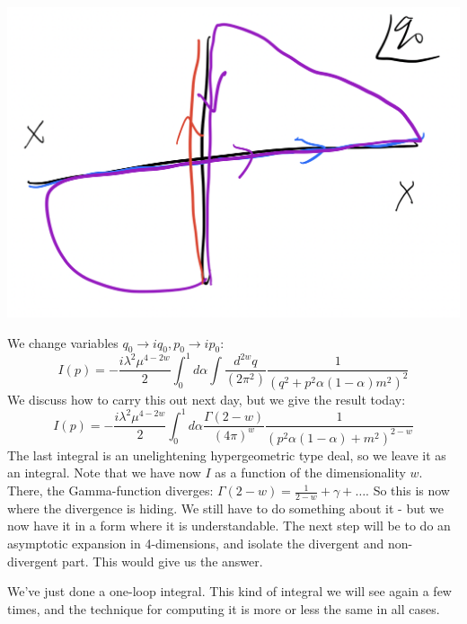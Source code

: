 \begin{center}
\includegraphics[scale=0.3]{Images/fig-lec28integral.png}
\end{center}

We change variables $q_0 \to iq_0, p_0 \to ip_0$:
\begin{equation}
    I(p) = -\frac{i\lambda^2 \mu^{4-2w}}{2}\int_0^1d\alpha \int \frac{d^{2w}q}{(2\pi^2)}\frac{1}{(q^2 + p^2\alpha(1 - \alpha)m^2)^2}
\end{equation}
We discuss how to carry this out next day, but we give the result today:
\begin{equation}
    I(p) = -\frac{i\lambda^2\mu^{4 - 2w}}{2}\int_0^1 d\alpha \frac{\Gamma(2 - w)}{(4\pi)^w} \frac{1}{(p^2\alpha(1-\alpha) + m^2)^{2-w}}
\end{equation} 
The last integral is an unelightening hypergeometric type deal, so we leave it as an integral. Note that we have now $I$ as a function of the dimensionality $w$. There, the Gamma-function diverges: $\Gamma(2 - w) = \frac{1}{2-w} + \gamma + \ldots$. So this is now where the divergence is hiding. We still have to do something about it - but we now have it in a form where it is understandable. The next step will be to do an asymptotic expansion in 4-dimensions, and isolate the divergent and non-divergent part. This would give us the answer.

We've just done a one-loop integral. This kind of integral we will see again a few times, and the technique for computing it is more or less the same in all cases.